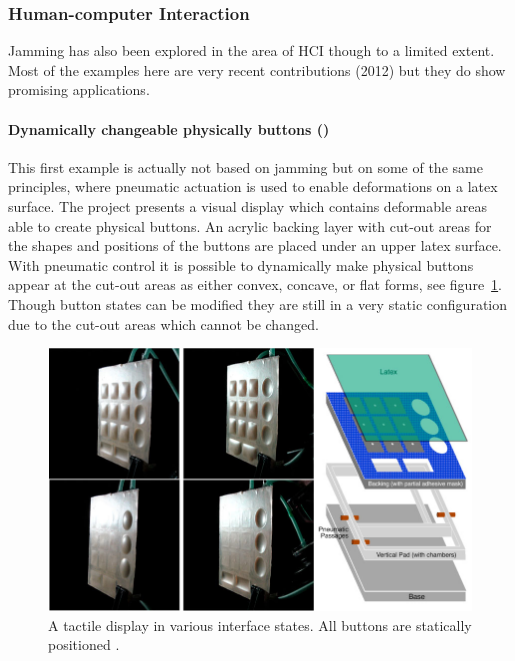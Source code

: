 \subsubsection{Human-computer Interaction}
\label{ch:jamming:related-work:hci}
Jamming has also been explored in the area of HCI though to a limited extent.
Most of the examples here are very recent contributions (2012) but they do show promising applications.

\paragraph{Dynamically changeable physically buttons (\citeyear{harrison2009providing})} 
\label{ch:jamming:related-work:hci:dynbuttons}
This first example is actually not based on jamming but on some of the same principles, where pneumatic actuation is used to enable deformations on a latex surface.
The project presents a visual display which contains deformable areas able to create physical buttons.
An acrylic backing layer with cut-out areas for the shapes and positions of the buttons are placed under an upper latex surface.
With pneumatic control it is possible to dynamically make physical buttons appear at the cut-out areas as either convex, concave, or flat forms, see figure~\ref{fig:ch:jamming:concepts:harrisonhudson}.
Though button states can be modified they are still in a very static configuration due to the cut-out areas which cannot be changed.

\begin{figure}[h]
  \centering
  \begin{minipage}[b]{.8\textwidth}
    \centering
    \includegraphics[width=.7\linewidth]{figures/jamming/harrisonhudson}
    \caption{A tactile display in various interface states. All buttons are statically positioned \citep{harrison2009providing}.}
    \label{fig:ch:jamming:concepts:harrisonhudson}
  \end{minipage}
\end{figure}


